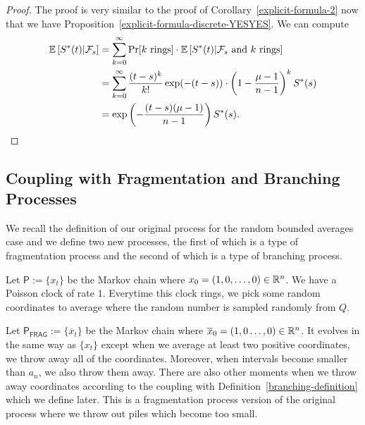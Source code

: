 \documentclass[12pt]{article}
\begin{document}
\begin{proof}
	The proof is very similar to the proof of Corollary~\ref{explicit-formula-2} now that we have Proposition~\ref{explicit-formula-discrete-YESYES}. We can compute 
	\begin{align*}
		\mathbb{E} \left [S^*(t) | \mathcal{F}_s \right ] & = \sum_{k = 0}^\infty \Pr[k \text{ rings}] \cdot \mathbb{E} \left [ S^*(t) | \mathcal{F}_s \text{ and } k \text{ rings} \right ] \\
		& = \sum_{k = 0}^\infty \frac{(t-s)^k}{k!} \exp (-(t-s)) \cdot \left ( 1 - \frac{\mu - 1}{n-1} \right )^k S^*(s) \\
		& = \exp \left ( - \frac{(t-s) (\mu - 1)}{n-1} \right ) S^*(s). 
	\end{align*}
\end{proof}

\subsection{Coupling with Fragmentation and Branching Processes}

We recall the definition of our original process for the random bounded averages case and we define two new processes, the first of which is a type of fragmentation process and the second of which is a type of branching process. 

\begin{defn} 
	Let $\mathsf{P} := \{x_t\}$ be the Markov chain where $x_0 = (1, 0, \ldots, 0) \in \mathbb{R}^n$. We have a Poisson clock of rate $1$. Everytime this clock rings, we pick some random coordinates to average where the random number is sampled randomly from $Q$. 
\end{defn}

\begin{defn}  \label{fragmentation-definition}
	Let $\mathsf{P}_{\mathsf{FRAG}} := \{\overline{x}_t\}$ be the Markov chain where $\overline{x}_0 = (1, 0 \ldots, 0) \in \mathbb{R}^n$. It evolves in the same way as $\{x_t\}$ except when we average at least two positive coordinates, we throw away all of the coordinates. Moreover, when intervals become smaller than $a_n$, we also throw them away. There are also other moments when we throw away coordinates according to the coupling with Definition~\ref{branching-definition} which we define later. This is a fragmentation process version of the original process where we throw out piles which become too small. 
\end{defn}
\end{document}
